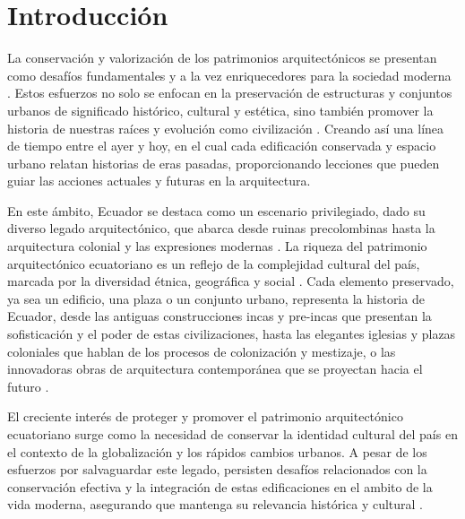 \documentclass[journal,article,submit,pdftex,moreauthors]{Definitions/mdpi}
\begin{document}
 
\section{Introducción}

La conservación y valorización de los patrimonios arquitectónicos se presentan como desafíos fundamentales y a la vez enriquecedores para la sociedad moderna \cite{art:articulo1}. Estos esfuerzos no solo se enfocan en la preservación de estructuras y conjuntos urbanos de significado histórico, cultural y estética, sino también promover la historia de nuestras raíces y evolución como civilización \cite{art:articulo2}. Creando así una línea de tiempo entre el ayer y hoy, en el cual cada edificación conservada y espacio urbano relatan historias de eras pasadas, proporcionando lecciones que pueden guiar las acciones actuales y futuras en la arquitectura\cite{art:articulo3}.

En este ámbito, Ecuador se destaca como un escenario privilegiado, dado su diverso legado arquitectónico, que abarca desde ruinas precolombinas hasta la arquitectura colonial y las expresiones modernas \cite{art:articulo4}.  La riqueza del patrimonio arquitectónico ecuatoriano es un reflejo de la complejidad cultural del país, marcada por la diversidad étnica, geográfica y social \cite{art:articulo5}. Cada elemento preservado, ya sea un edificio, una plaza o un conjunto urbano, representa la historia de Ecuador, desde las antiguas construcciones incas y pre-incas que presentan la sofisticación y el poder de estas civilizaciones, hasta las elegantes iglesias y plazas coloniales que hablan de los procesos de colonización y mestizaje, o las innovadoras obras de arquitectura contemporánea que se proyectan hacia el futuro \cite{art:articulo6}.

El creciente interés de proteger y promover el patrimonio arquitectónico ecuatoriano surge como  la necesidad de conservar la identidad cultural del país en el contexto de la globalización y los rápidos cambios urbanos. A pesar de los  esfuerzos por salvaguardar este legado, persisten desafíos relacionados con la conservación efectiva y la integración de estas edificaciones en el ambito de la vida moderna, asegurando que mantenga su relevancia histórica y cultural \cite{art:articulo7}.
\end{document}
